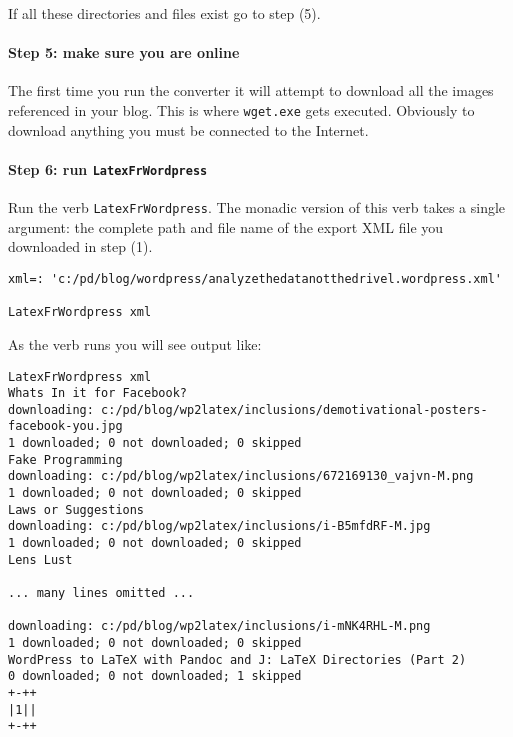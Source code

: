 If all these directories and files exist go to step (5).

\paragraph{Step 5: make sure you are online}

The first time you run the converter it will attempt to download all the
images referenced in your blog. This is where \texttt{wget.exe} gets
executed. Obviously to download anything you must be connected to the
Internet.

\paragraph{Step 6: run \texttt{LatexFrWordpress}}

Run the verb \texttt{LatexFrWordpress}. The monadic version of this verb
takes a single argument: the complete path and file name of the export
XML file you downloaded in step (1).

\footnotesize
\begin{tcolorbox}[breakable, size=fbox, boxrule=1pt, pad at break*=1mm,colback=cellbackground, colframe=cellborder]
\begin{lstlisting}[language=jdoc, frame=single,framerule=0pt,label=lst:scr442x00]
xml=: 'c:/pd/blog/wordpress/analyzethedatanotthedrivel.wordpress.xml'

LatexFrWordpress xml
\end{lstlisting}
\end{tcolorbox}
\normalsize

As the verb runs you will see output like:


\begin{tcolorbox}[breakable, size=fbox, boxrule=1pt, pad at break*=1mm,colback=cellbackground, colframe=cellborder]
\begin{lstlisting}[language=jdoc, frame=single,framerule=0pt,label=lst:scr442X0]
   LatexFrWordpress xml
Whats In it for Facebook?
downloading: c:/pd/blog/wp2latex/inclusions/demotivational-posters-facebook-you.jpg
1 downloaded; 0 not downloaded; 0 skipped
Fake Programming
downloading: c:/pd/blog/wp2latex/inclusions/672169130_vajvn-M.png
1 downloaded; 0 not downloaded; 0 skipped
Laws or Suggestions
downloading: c:/pd/blog/wp2latex/inclusions/i-B5mfdRF-M.jpg
1 downloaded; 0 not downloaded; 0 skipped
Lens Lust

... many lines omitted ...

downloading: c:/pd/blog/wp2latex/inclusions/i-mNK4RHL-M.png
1 downloaded; 0 not downloaded; 0 skipped
WordPress to LaTeX with Pandoc and J: LaTeX Directories (Part 2)
0 downloaded; 0 not downloaded; 1 skipped
+-++
|1||
+-++
\end{lstlisting}
\end{tcolorbox}

